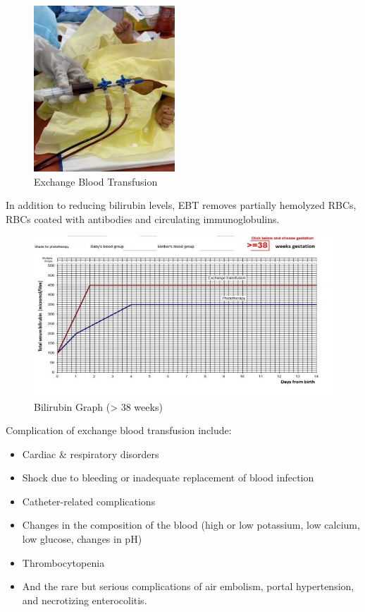 \documentclass[
  letterpaper,
  DIV=11,
  numbers=noendperiod]{scrreprt}
\providecommand{\tightlist}{%
  \setlength{\itemsep}{0pt}\setlength{\parskip}{0pt}}\usepackage{longtable,booktabs,array}
\begin{document}
\begin{figure}

{\centering \includegraphics{neo-ebt.jpg}

}

\caption{Exchange Blood Transfusion}

\end{figure}

In addition to reducing bilirubin levels, EBT removes partially
hemolyzed RBCs, RBCs coated with antibodies and circulating
immunoglobulins.

\begin{figure}

{\centering \includegraphics{ebt-chart.jpg}

}

\caption{Bilirubin Graph (\textgreater{} 38 weeks)}

\end{figure}

Complication of exchange blood transfusion include:

\begin{itemize}
\tightlist
\item
  Cardiac \& respiratory disorders
\item
  Shock due to bleeding or inadequate replacement of blood infection
\item
  Catheter-related complications
\item
  Changes in the composition of the blood (high or low potassium, low
  calcium, low glucose, changes in pH)
\item
  Thrombocytopenia
\item
  And the rare but serious complications of air embolism, portal
  hypertension, and necrotizing enterocolitis.
\end{itemize}
\end{document}

